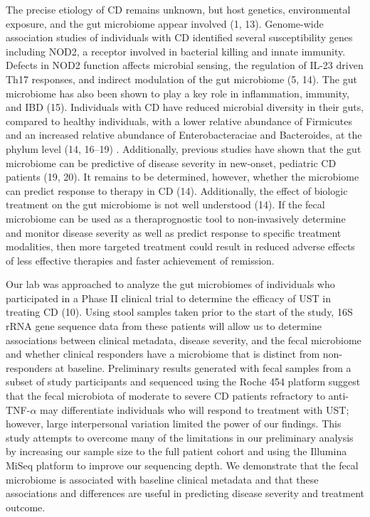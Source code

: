 \documentclass[11pt,]{article}
\begin{document}
The precise etiology of CD remains unknown, but host genetics,
environmental exposure, and the gut microbiome appear involved (1, 13).
Genome-wide association studies of individuals with CD identified
several susceptibility genes including NOD2, a receptor involved in
bacterial killing and innate immunity. Defects in NOD2 function affects
microbial sensing, the regulation of IL-23 driven Th17 responses, and
indirect modulation of the gut microbiome (5, 14). The gut microbiome
has also been shown to play a key role in inflammation, immunity, and
IBD (15). Individuals with CD have reduced microbial diversity in their
guts, compared to healthy individuals, with a lower relative abundance
of Firmicutes and an increased relative abundance of Enterobacteraciae
and Bacteroides, at the phylum level (14, 16--19) . Additionally,
previous studies have shown that the gut microbiome can be predictive of
disease severity in new-onset, pediatric CD patients (19, 20). It
remains to be determined, however, whether the microbiome can predict
response to therapy in CD (14). Additionally, the effect of biologic
treatment on the gut microbiome is not well understood (14). If the
fecal microbiome can be used as a theraprognostic tool to non-invasively
determine and monitor disease severity as well as predict response to
specific treatment modalities, then more targeted treatment could result
in reduced adverse effects of less effective therapies and faster
achievement of remission.

Our lab was approached to analyze the gut microbiomes of individuals who
participated in a Phase II clinical trial to determine the efficacy of
UST in treating CD (10). Using stool samples taken prior to the start of
the study, 16S rRNA gene sequence data from these patients will allow us
to determine associations between clinical metadata, disease severity,
and the fecal microbiome and whether clinical responders have a
microbiome that is distinct from non-responders at baseline. Preliminary
results generated with fecal samples from a subset of study participants
and sequenced using the Roche 454 platform suggest that the fecal
microbiota of moderate to severe CD patients refractory to
anti-TNF-\({\alpha}\) may differentiate individuals who will respond to
treatment with UST; however, large interpersonal variation limited the
power of our findings. This study attempts to overcome many of the
limitations in our preliminary analysis by increasing our sample size to
the full patient cohort and using the Illumina MiSeq platform to improve
our sequencing depth. We demonstrate that the fecal microbiome is
associated with baseline clinical metadata and that these associations
and differences are useful in predicting disease severity and treatment
outcome.
\end{document}
